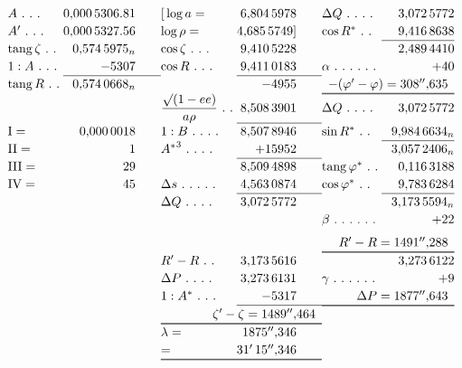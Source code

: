 {\small
\[
\renewcommand{\arraystretch}{1.16}
\begin{array}{@{}l@{\;}r@{\qquad}l@{\;}r@{\qquad}l@{\;}r@{}}
A\ \ldotp\,\ldotp\,\ldotp&0{,}000\,5306.81&
{[}\log a=&6{,}804\,5978&
\Delta Q\ \ldotp\,\ldotp\,\ldotp\,\ldotp&3{,}072\,5772\\
A'\ \ldotp\,\ldotp\,\ldotp&0{,}000\,5327.56&
\log\rho=&4{,}685\,5749]&
\cos R^*\ \ldotp\,\ldotp&9{,}416\,8638\\
\cline{6-6}
\operatorname{tang}\zeta\ \ldotp\,\ldotp&0{,}574\,5975_n&
\cos\zeta\ \ldotp\,\ldotp\,\ldotp&9{,}410\,5228&&2{,}489\,4410\\
1:A\ \ldotp\,\ldotp\,\ldotp&-5307&
\cos R\ \ldotp\,\ldotp\,\ldotp&9{,}411\,0183&
\alpha\ \ldotp\,\ldotp\,\ldotp\,\ldotp\,\ldotp\,\ldotp&+40\\
\cline{2-2}\cline{4-4}
\operatorname{tang}R\ \ldotp\,\ldotp&0{,}574\,0668_n&&-4955&
\multicolumn{2}{r}{-(\varphi'-\varphi)=308''{,}635}\\
\cline{5-6}\noalign{\vskip .45pt}\cline{5-6}
&&\dfrac{\surd(1-ee)}{a\rho}\ \ldotp\,\ldotp&8{,}508\,3901&
\Delta Q\ \ldotp\,\ldotp\,\ldotp\,\ldotp&3{,}072\,5772\\
\cline{4-4}
\mathrm I=&0{,}000\,0018&
1:B\ \ldotp\,\ldotp\,\ldotp\,\ldotp&8{,}507\,8946&
\sin R^*\ \ldotp\,\ldotp&9{,}984\,6634_n\\
\cline{6-6}
\mathrm{II}=&1&
{A^{*}}^3\ \ldotp\,\ldotp\,\ldotp\,\ldotp&+15952&&3{,}057\,2406_n\\
\cline{4-4}
\mathrm{III}=&29&&8{,}509\,4898&
\operatorname{tang}\varphi^*\ \ldotp\,\ldotp&0{,}116\,3188\\
\mathrm{IV}=&45&
\Delta s\ \ldotp\,\ldotp\,\ldotp\,\ldotp\,\ldotp&4{,}563\,0874&
\cos\varphi^*\ \ldotp\,\ldotp&9{,}783\,6284\\
\cline{4-4}\cline{6-6}
&&\Delta Q\ \ldotp\,\ldotp\,\ldotp\,\ldotp&3{,}072\,5772&&3{,}173\,5594_n\\
&&&&\beta\ \ldotp\,\ldotp\,\ldotp\,\ldotp\,\ldotp\,\ldotp&+22\\[1ex]
&&&&\multicolumn{2}{r}{R'-R=1491''{,}288}\\
\cline{5-6}\noalign{\vskip .45pt}\cline{5-6}
&&R'-R\ \ldotp\,\ldotp&3{,}173\,5616&&3{,}273\,6122\\
&&\Delta P\ \ldotp\,\ldotp\,\ldotp\,\ldotp&3{,}273\,6131&
\gamma\ \ldotp\,\ldotp\,\ldotp\,\ldotp\,\ldotp\,\ldotp&+9\\
&&1:A^*\ \ldotp\,\ldotp\,\ldotp&-5317&
\multicolumn{2}{r}{\Delta P=1877''{,}643}\\
\cline{4-4}\cline{5-6}\noalign{\vskip .45pt}\cline{5-6}
&&\multicolumn{2}{r}{\zeta'-\zeta=1489''{,}464}&&\\
\cline{3-4}\noalign{\vskip .45pt}\cline{3-4}
&&\lambda=&1875''{,}346&&\\
&&=&31'\,15''{,}346&&\\
\cline{3-4}\noalign{\vskip .45pt}\cline{3-4}
\end{array}
\]
\par
}

